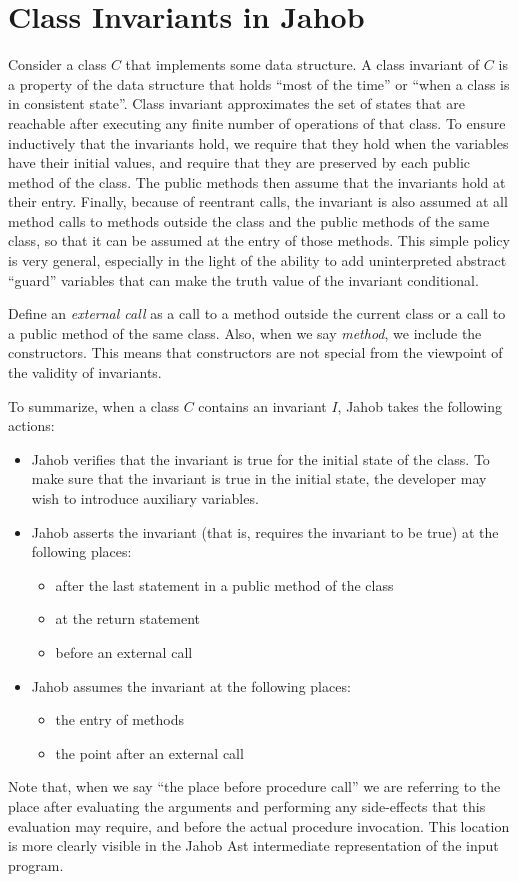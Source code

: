 \section{Class Invariants in Jahob}

Consider a class $C$ that implements some data structure.  A class
invariant of $C$ is a property of the data structure that holds ``most
of the time'' or ``when a class is in consistent state''.  Class
invariant approximates the set of states that are reachable after
executing any finite number of operations of that class.  To ensure
inductively that the invariants hold, we require that they hold when
the variables have their initial values, and require that they are
preserved by each public method of the class.  The public methods then
assume that the invariants hold at their entry.  Finally, because of
reentrant calls, the invariant is also assumed at all method calls to
methods outside the class and the public methods of the same class, so
that it can be assumed at the entry of those methods.  This simple
policy is very general, especially in the light of the ability to add
uninterpreted abstract ``guard'' variables that can make the truth
value of the invariant conditional.

Define an \emph{external call} as a call to a method outside the
current class or a call to a public method of the same class.  Also,
when we say \emph{method}, we include the constructors.  This means
that constructors are not special from the viewpoint of the validity
of invariants.

To summarize, when a class $C$ contains an invariant $I$, Jahob
takes the following actions:
\begin{itemize}
\item Jahob verifies that the invariant is true for the initial state
of the class.  To make sure that the invariant is true in the initial
state, the developer may wish to introduce auxiliary variables.
\item Jahob asserts the invariant (that is, requires the invariant 
to be true) at the following places:
\begin{itemize}
\item after the last statement in a public method of the class
\item at the return statement
\item before an external call
\end{itemize}
\item Jahob assumes the invariant at the following places:
\begin{itemize}
\item the entry of methods
\item the point after an external call
\end{itemize}
\end{itemize}
Note that, when we say ``the place before procedure call'' we are
referring to the place after evaluating the arguments and performing
any side-effects that this evaluation may require, and before the
actual procedure invocation.  This location is more clearly visible in
the Jahob Ast intermediate representation of the input program.

